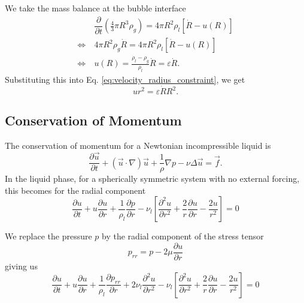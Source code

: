 \documentclass{article}
\numberwithin{equation}{section}
\newcommand{\pd}[2]{\dfrac{\partial #1}{\partial #2}}
\newcommand{\pdd}[2]{\dfrac{\partial^2 #1}{\partial #2^2}}
\begin{document}
We take the mass balance at the bubble interface \cite{scrivenDynamicsPhaseGrowth1995}
\begin{equation}
    \begin{split}
        &\pd{}{t}\left(\frac43 \pi R^3 \rho_g\right) =
        4\pi R^2 \rho_l \left[\dot{R} - u(R)\right] \\
        \Leftrightarrow\ &4\pi R^2 \rho_g \dot{R} =
        4\pi R^2 \rho_l \left[\dot{R} - u(R)\right] \\
        \Leftrightarrow\ &u(R) =
        \frac{\rho_l - \rho_g}{\rho_l} \dot{R} =
        \varepsilon \dot{R}.
    \end{split}
\end{equation}
Substituting this into Eq. \eqref{eq:velocity_radius_constraint}, we get
\begin{equation}
    u r^2 = \varepsilon \dot{R} R^2.
    \label{eq:velocity_radius_finished}
\end{equation}

\subsection{Conservation of Momentum}

The conservation of momentum for a Newtonian incompressible liquid is
\begin{equation}
    \pd{\vec{u}}{t} +
    (\vec{u} \cdot \nabla) \vec{u} +
    \frac{1}{\rho} \nabla p -
    \nu \Delta \vec{u}
    = \vec{f}.
\end{equation}
In the liquid phase, for a spherically symmetric system with no external forcing, this becomes for the radial component
\begin{equation}
    \pd{u}{t}
    + u\pd{u}{r}
    + \frac{1}{\rho_l} \pd{p}{r}
    - \nu_l \left[
        \pdd{u}{r}
        + \frac{2}{r} \pd{u}{r}
        - \frac{2u}{r^2}
    \right]
    = 0
\end{equation}

We replace the pressure $p$ by the radial component of the stress tensor
\begin{equation}
    p_{rr} = p  - 2\mu \pd{u}{r}
\end{equation}
giving us
\begin{equation}
    \pd{u}{t}
    + u\pd{u}{r}
    + \frac{1}{\rho_l} \pd{p_{rr}}{r}
    + 2 \nu_l \pdd{u}{r}
    - \nu_l \left[
        \pdd{u}{r}
        + \frac{2}{r} \pd{u}{r}
        - \frac{2u}{r^2}
    \right]
    = 0
\end{equation}
\end{document}
